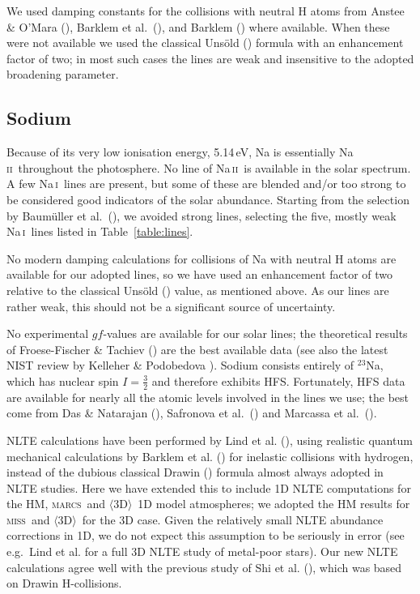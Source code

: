 \documentclass[traditabstract]{aa}
\newcommand{\oneDAV}{$\langle\mathrm{3D}\rangle$}
\newcommand{\marcs}{\textsc{marcs}}
\newcommand{\miss}{\textsc{miss}}
\newcommand{\altnai}{Na\,\textsc{i}}
\newcommand{\altnaii}{Na\,\textsc{ii}}
\newcommand{\nai}{\altnai\ }
\newcommand{\naii}{\altnaii\ }
\begin{document}
We used damping constants for the collisions with neutral H atoms from Anstee \& O'Mara (\cite{anst}), Barklem et al.\ (\cite{bark1}), and Barklem (\cite{bark2}) where available. When these were not available we used the classical Uns\"old (\cite{unsold}) formula with an enhancement factor of two; in most such cases the lines are weak and insensitive to the adopted broadening parameter.

\subsection{Sodium}
Because of its very low ionisation energy, 5.14\,eV, Na is essentially \naii throughout the photosphere.  No line of \naii is available in the solar spectrum. A few \nai lines are present, but some of these are blended and/or too strong to be considered good indicators of the solar abundance. Starting from the selection by Baum\"uller et al.\ (\cite{bau1}), we avoided strong lines, selecting the five, mostly weak \nai lines listed in Table~\ref{table:lines}.

No modern damping calculations for collisions of Na with neutral H atoms are available for our adopted lines, so we have used an enhancement factor of two relative to the classical Uns\"old (\cite{unsold}) value, as mentioned above. As our lines are rather weak, this should not be a significant source of uncertainty.

No experimental $gf$-values are available for our solar lines; the theoretical results of Froese-Fischer \& Tachiev (\cite{FF}) are the best available data (see also the latest NIST review by Kelleher \& Podobedova \cite{kel1}).  Sodium consists entirely of $^{23}$Na, which has nuclear spin $I=\frac32$ and therefore exhibits HFS.  Fortunately, HFS data are available for nearly all the atomic levels involved in the lines we use; the best come from Das \& Natarajan (\cite{Das08}), Safronova et al.~(\cite{Safronova99}) and Marcassa et al.~(\cite{Marcassa98}).

NLTE calculations have been performed by Lind et al. (\cite{lind_na}), using realistic quantum mechanical calculations by Barklem et al. (\cite{barklem_na}) for inelastic collisions with hydrogen, instead of the dubious classical Drawin (\cite{dra}) formula almost always adopted in NLTE studies. Here we have extended this to include 1D NLTE computations for the HM, \marcs\ and \oneDAV\ 1D model atmospheres; we adopted the HM results for \miss\ and \oneDAV\ for the 3D case. Given the relatively small NLTE abundance corrections in 1D, we do not expect this assumption to be seriously in error (see e.g.\ Lind et al. \cite{lind_li6} for a full 3D NLTE study of metal-poor stars). 
Our new NLTE calculations agree well with the previous study of Shi et al. (\cite{shi1}), which was based on Drawin H-collisions.
\end{document}
